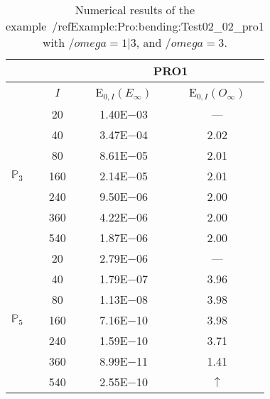 \begin{table}[H]
\caption{Numerical results of the example~/ref{Example:Pro:bending:Test02_02_pro1} with $/omega=1|3$, and $/omega=3$.}
\setlength{\tabcolsep}{5pt}
\centering
\begin{tabular}{@{}l c c c@{}}
\toprule
 &  & \multicolumn{2}{c}{PRO1}\\
\midrule
 & $I$ & E$_{0,I}(E_{\infty})$ & E$_{0,I}(O_{\infty})$\\
\midrule
\multirow{7}{*}{$\mathbb{P}_{3}$}
 & 20 & 1.40E$-$03 & ---\\
 & 40 & 3.47E$-$04 & 2.02\\
 & 80 & 8.61E$-$05 & 2.01\\
 & 160 & 2.14E$-$05 & 2.01\\
 & 240 & 9.50E$-$06 & 2.00\\
 & 360 & 4.22E$-$06 & 2.00\\
 & 540 & 1.87E$-$06 & 2.00\\
\midrule
\multirow{7}{*}{$\mathbb{P}_{5}$}
 & 20 & 2.79E$-$06 & ---\\
 & 40 & 1.79E$-$07 & 3.96\\
 & 80 & 1.13E$-$08 & 3.98\\
 & 160 & 7.16E$-$10 & 3.98\\
 & 240 & 1.59E$-$10 & 3.71\\
 & 360 & 8.99E$-$11 & 1.41\\
 & 540 & 2.55E$-$10 & $\uparrow$\\
\bottomrule
\end{tabular}
\label{Table:PRO:test_02_02_test7_pro1}
\end{table}
